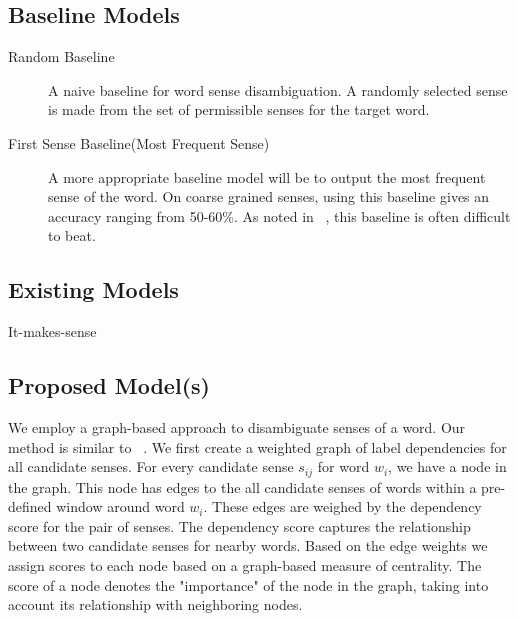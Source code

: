 \documentclass[11pt,letterpaper]{article}
\newcommand{\blue}[1]{\textcolor{RoyalBlue}{#1}}
\newcommand{\instructions}[1]{\blue{\textit{#1}}}
\begin{document}
\subsection{Baseline Models}
\label{sec:baseline-models}
\begin{description}
\item[Random Baseline] A naive baseline for word sense disambiguation. A randomly selected sense is made from the set of permissible senses for the target word. \\
\item[First Sense Baseline(Most Frequent Sense)] A more appropriate baseline model will be to output the most frequent sense of the word. On coarse grained senses, using this baseline gives an accuracy ranging from 50-60\%. As noted in ~\cite{navigli2009word}, this baseline is often difficult to beat.
\end{description}

\subsection{Existing Models}
\label{sec:existing-models}
It-makes-sense
\subsection{Proposed Model(s)}
\label{sec:proposed-models}
We employ a graph-based approach to disambiguate senses of a word. Our method is similar to ~\cite{Sinha}. We first create a weighted graph of label dependencies for all candidate senses. For every candidate sense $s_{ij}$ for word $w_i$, we have a node in the graph. This node has edges to the all candidate senses of words within a pre-defined window around word $w_i$. These edges are weighed by the dependency score for the pair of senses. The dependency score captures the relationship between two candidate senses for nearby words. Based on the edge weights we assign scores to each node based on a graph-based measure of centrality. The score of a node denotes the "importance" of the node in the graph, taking into account its relationship with neighboring nodes.
\end{document}
